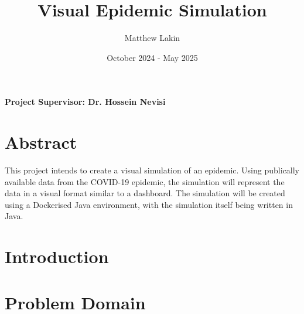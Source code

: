 \documentclass{article}
\title{Visual Epidemic Simulation}
\author{Matthew Lakin}
\date{October 2024 - May 2025}
\begin{document}
\maketitle

\begin{center}
    \vspace*{\fill}
    \textbf{\Large{Project Supervisor: Dr. Hossein Nevisi}}
    \vspace*{\fill}
\end{center}
\thispagestyle{empty}

\newpage

\tableofcontents


\newpage

\section{Abstract}
This project intends to create a visual simulation of an epidemic. Using publically available data from the COVID-19 epidemic, the simulation will represent the data in a visual format similar to a dashboard. The simulation will be created using a Dockerised Java environment, with the simulation itself being written in Java.
\newpage

\section{Introduction}
\newpage

\section{Problem Domain}
\end{document}
